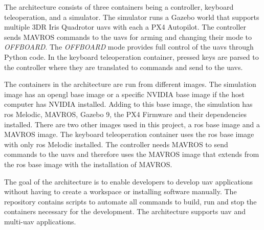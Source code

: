 The architecture consists of three containers being a controller, keyboard teleoperation, and a simulator. The simulator runs a Gazebo world that supports multiple 3DR Iris Quadrotor \acsp{uav} with each a PX4 Autopilot. The controller sends MAVROS commands to the \acsp{uav} for arming and changing their mode to \textit{OFFBOARD}. The \textit{OFFBOARD} mode provides full control of the \acsp{uav} through Python code. In the keyboard teleoperation container, pressed keys are parsed to the controller where they are translated to commands and send to the \acsp{uav}.

The containers in the architecture are run from different images. The simulation image has an \acs{opengl} base image or a specific NVIDIA base image if the host computer has NVIDIA installed. Adding to this base image, the simulation has \acs{ros} Melodic, MAVROS, Gazebo 9, the PX4 Firmware and their dependencies installed. There are two other images used in this project, a \acs{ros} base image and a MAVROS image. The keyboard teleoperation container uses the \acs{ros} base image with only \acs{ros} Melodic installed. The controller needs MAVROS to send commands to the \acsp{uav} and therefore uses the MAVROS image that extends from the \acs{ros} base image with the installation of MAVROS.

The goal of the architecture is to enable developers to develop \acs{uav} applications without having to create a workspace or installing software manually. The repository contains scripts to automate all commands to build, run and stop the containers necessary for the development. The architecture supports \acs{uav} and multi\hyp{}\acs{uav} applications.